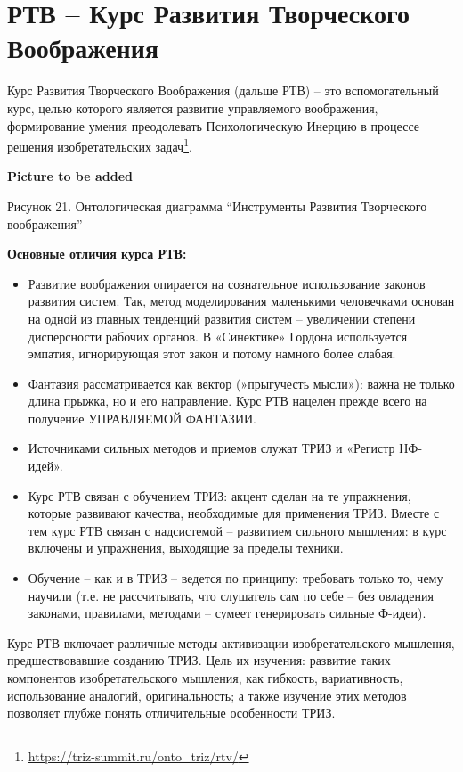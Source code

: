 \documentclass[11pt,a4paper]{article}
\newcommand{\addpicture}{\textbf{Picture to be added}\par}
\begin{document}
\section{РТВ -- Курс Развития Творческого Воображения}

Курс Развития Творческого Воображения (дальше РТВ) --
это вспомогательный курс, целью которого является развитие управляемого
воображения, формирование умения преодолевать Психологическую Инерцию в
процессе решения изобретательских
задач\footnote{\url{https://triz-summit.ru/onto_triz/rtv/}}. 
\begin{center}
  \addpicture
  Рисунок 21. Онтологическая диаграмма “Инструменты Развития Творческого
  воображения”
\end{center}
\textbf{Основные отличия курса РТВ:}
\begin{itemize}
\item[1.] Развитие воображения опирается на сознательное использование законов
  развития систем. Так, метод моделирования маленькими человечками основан на
  одной из главных тенденций развития систем -- увеличении степени
  дисперсности рабочих органов. В «Синектике» Гордона используется эмпатия,
  игнорирующая этот закон и потому намного более слабая.
\item[2.] Фантазия рассматривается как вектор (»прыгучесть мысли»): важна не
  только длина прыжка, но и его направление. Курс РТВ нацелен прежде всего на
  получение УПРАВЛЯЕМОЙ ФАНТАЗИИ.
\item[3.] Источниками сильных методов и приемов служат ТРИЗ и «Регистр
  НФ-идей».
\item[4.] Курс РТВ связан с обучением ТРИЗ: акцент сделан на те упражнения,
  которые развивают качества, необходимые для применения ТРИЗ. Вместе с тем
  курс РТВ связан с надсистемой -- развитием сильного мышления: в курс
  включены и упражнения, выходящие за пределы техники.
\item[5.] Обучение -- как и в ТРИЗ -- ведется по принципу: требовать только
  то, чему научили (т.е. не рассчитывать, что слушатель сам по себе -- без
  овладения законами, правилами, методами -- сумеет генерировать сильные
  Ф-идеи).
\end{itemize}
Курс РТВ включает различные методы активизации изобретательского мышления,
предшествовавшие созданию ТРИЗ. Цель их изучения: развитие таких компонентов
изобретательского мышления, как гибкость, вариативность, использование
аналогий, оригинальность; а также изучение этих методов позволяет глубже
понять отличительные особенности ТРИЗ.
\end{document}
